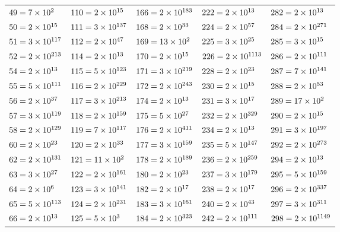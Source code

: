 \documentclass[10pt,a4paper]{book}
\begin{document}
\begin{tabular}{lllll}
	$49=\num{7e{2}}$&$110=\num{2e{1}5e{1}11e{1}}$&$166=\num{2e{1}83e{1}}$&$222=\num{2e{1}3e{1}37e{1}}$&$282=\num{2e{1}3e{1}47e{1}}$\\
	$50=\num{2e{1}5e{2}}$&$111=\num{3e{1}37e{1}}$&$168=\num{2e{3}3e{1}7e{1}}$&$224=\num{2e{5}7e{1}}$&$284=\num{2e{2}71e{1}}$\\
	$51=\num{3e{1}17e{1}}$&$112=\num{2e{4}7e{1}}$&$169=\num{13e{2}}$&$225=\num{3e{2}5e{2}}$&$285=\num{3e{1}5e{1}19e{1}}$\\
	$52=\num{2e{2}13e{1}}$&$114=\num{2e{1}3e{1}19e{1}}$&$170=\num{2e{1}5e{1}17e{1}}$&$226=\num{2e{1}113e{1}}$&$286=\num{2e{1}11e{1}13e{1}}$\\
	$54=\num{2e{1}3e{3}}$&$115=\num{5e{1}23e{1}}$&$171=\num{3e{2}19e{1}}$&$228=\num{2e{2}3e{1}19e{1}}$&$287=\num{7e{1}41e{1}}$\\
	$55=\num{5e{1}11e{1}}$&$116=\num{2e{2}29e{1}}$&$172=\num{2e{2}43e{1}}$&$230=\num{2e{1}5e{1}23e{1}}$&$288=\num{2e{5}3e{2}}$\\
	$56=\num{2e{3}7e{1}}$&$117=\num{3e{2}13e{1}}$&$174=\num{2e{1}3e{1}29e{1}}$&$231=\num{3e{1}7e{1}11e{1}}$&$289=\num{17e{2}}$\\
	$57=\num{3e{1}19e{1}}$&$118=\num{2e{1}59e{1}}$&$175=\num{5e{2}7e{1}}$&$232=\num{2e{3}29e{1}}$&$290=\num{2e{1}5e{1}29e{1}}$\\
	$58=\num{2e{1}29e{1}}$&$119=\num{7e{1}17e{1}}$&$176=\num{2e{4}11e{1}}$&$234=\num{2e{1}3e{2}13e{1}}$&$291=\num{3e{1}97e{1}}$\\
	$60=\num{2e{2}3e{1}5e{1}}$&$120=\num{2e{3}3e{1}5e{1}}$&$177=\num{3e{1}59e{1}}$&$235=\num{5e{1}47e{1}}$&$292=\num{2e{2}73e{1}}$\\
	$62=\num{2e{1}31e{1}}$&$121=\num{11e{2}}$&$178=\num{2e{1}89e{1}}$&$236=\num{2e{2}59e{1}}$&$294=\num{2e{1}3e{1}7e{2}}$\\
	$63=\num{3e{2}7e{1}}$&$122=\num{2e{1}61e{1}}$&$180=\num{2e{2}3e{2}5e{1}}$&$237=\num{3e{1}79e{1}}$&$295=\num{5e{1}59e{1}}$\\
	$64=\num{2e{6}}$&$123=\num{3e{1}41e{1}}$&$182=\num{2e{1}7e{1}13e{1}}$&$238=\num{2e{1}7e{1}17e{1}}$&$296=\num{2e{3}37e{1}}$\\
	$65=\num{5e{1}13e{1}}$&$124=\num{2e{2}31e{1}}$&$183=\num{3e{1}61e{1}}$&$240=\num{2e{4}3e{1}5e{1}}$&$297=\num{3e{3}11e{1}}$\\
	$66=\num{2e{1}3e{1}11e{1}}$&$125=\num{5e{3}}$&$184=\num{2e{3}23e{1}}$&$242=\num{2e{1}11e{2}}$&$298=\num{2e{1}149e{1}}$\\
\end{tabular}
\end{document}
